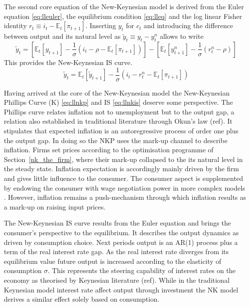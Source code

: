 \documentclass[12pt,a4paper,english]{article} %
\newcommand{\E}{\mathbb{E}} %
\begin{document}
	The second core equation of the New-Keynesian model is derived from the Euler equation \eqref{eq:lleuler}, the equilibrium condition \eqref{eq:lleq} and the log linear Fisher identity $r_t \equiv i_t - \E_t[\pi_{t+1}]$. Inserting $y_t$ for $c_t$ and introducing the difference between output and its natural level as $\tilde{y}_t \equiv y_t - y_t^n$ allows to write
	\begin{equation}
		\tilde{y}_t = 
		\left[
		\E_t[y_{t+1}] - \frac{1}{\sigma} (i_t - \rho - \E_t[\pi_{t+1}])
		\right]
		-
		\left[
		\E_t[y_{t+1}^n] - \frac{1}{\sigma} (r_t^n - \rho)
		\right]
	\end{equation}
	This provides the New-Keynesian IS curve.
	\begin{equation} \label{eq:llnkis}
		\tilde{y}_t = \E_t[\tilde{y}_{t+1}] - \frac{1}{\sigma} (i_t - r_t^n - \E_t[\pi_{t+1}])
	\end{equation}
	
	Having arrived at the core of the New-Keynesian model the New-Keynesian Phillips Curve (K) \eqref{eq:llnkp} and IS \eqref{eq:llnkis} deserve some perspective. 
	The Phillips curve relates inflation not to unemployment but to the output gap, a relation also established in traditional literature through Okun's law (ref). It stipulates that expected inflation is an autoregressive process of order one plus the output gap. In doing so the \ac{NKP} uses the mark-up channel to describe inflation. Firms set prices according to the optimisation programme of Section~\ref{nk_the_firm}, where their mark-up collapsed to the its natural level in the steady state. Inflation expectation is accordingly mainly driven by the firm and gives little influence to the consumer. The consumer aspect is supplemented by endowing the consumer with wage negotiation power in more complex models \cite{smets_shocks_2007}. However, inflation remains a push-mechanism through which inflation results as a mark-up on raising input prices.

	The New-Keynesian \ac{IS} curve results from the Euler equation and brings the consumer's perspective to the equilibrium. It describes the output dynamics as driven by consumption choice. Next periods output is an AR(1) process plus a term of the real interest rate gap. As the real interest rate diverges from its equilibrium value future output is increased according to the elasticity of consumption $\sigma$. This represents the steering capability of interest rates on the economy as theorised by Keynesian literature (ref). While in the traditional Keynesian model interest rate affect output through investment the NK model derives a similar effect solely based on consumption.
\end{document}
